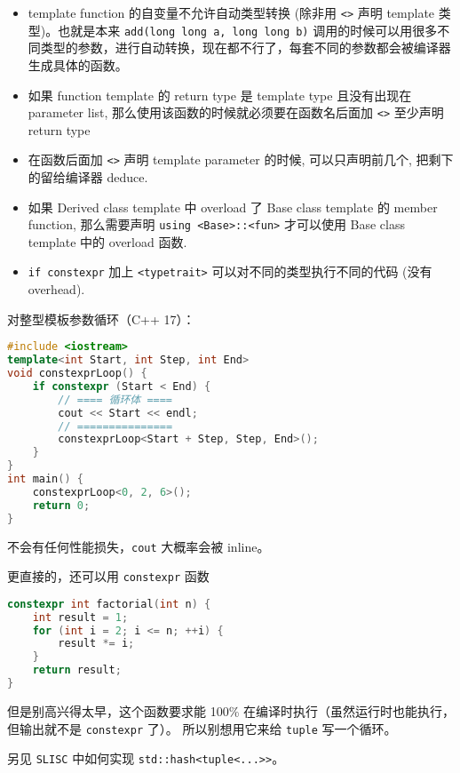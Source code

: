 
\begin{issues}
\issueDraft
\end{issues}

\begin{itemize}
\item template function 的自变量不允许自动类型转换 (除非用 \verb`<>` 声明 template 类型)。也就是本来 \verb`add(long long a, long long b)` 调用的时候可以用很多不同类型的参数，进行自动转换，现在都不行了，每套不同的参数都会被编译器生成具体的函数。
\item 如果 function template 的 return type 是 template type 且没有出现在 parameter list, 那么使用该函数的时候就必须要在函数名后面加 \verb`<>` 至少声明 return type
\item 在函数后面加 \verb`<>` 声明 template parameter 的时候, 可以只声明前几个, 把剩下的留给编译器 deduce.
\item 如果 Derived class template 中 overload 了 Base class template 的 member function, 那么需要声明 \verb`using <Base>::<fun>` 才可以使用 Base class template 中的 overload 函数.
\item \verb`if constexpr` 加上 \verb`<typetrait>` 可以对不同的类型执行不同的代码 (没有 overhead).
\end{itemize}

对整型模板参数循环（C++ 17）：
\begin{lstlisting}[language=cpp]
#include <iostream>
template<int Start, int Step, int End>
void constexprLoop() {
    if constexpr (Start < End) {
		// ==== 循环体 ====
        cout << Start << endl;
		// ===============
        constexprLoop<Start + Step, Step, End>();
    }
}
int main() {
    constexprLoop<0, 2, 6>();
    return 0;
}
\end{lstlisting}
不会有任何性能损失，\verb`cout` 大概率会被 inline。

更直接的，还可以用 \verb`constexpr` 函数
\begin{lstlisting}[language=cpp]
constexpr int factorial(int n) {
    int result = 1;
    for (int i = 2; i <= n; ++i) {
        result *= i;
    }
    return result;
}
\end{lstlisting}
但是别高兴得太早，这个函数要求能 100\% 在编译时执行（虽然运行时也能执行，但输出就不是 \verb`constexpr` 了）。 所以别想用它来给 \verb`tuple` 写一个循环。

另见 \verb`SLISC` 中如何实现 \verb`std::hash<tuple<...>>`。

